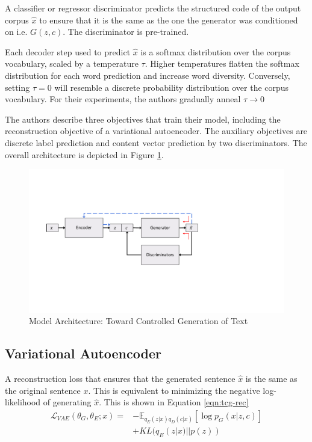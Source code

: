 A classifier or regressor discriminator predicts the structured code of the output corpus $\hat{x}$ to ensure that it is the same as the one the generator was conditioned on i.e. $G(z, c)$. The discriminator is pre-trained.

Each decoder step used to predict $\hat{x}$ is a softmax distribution over the corpus vocabulary, scaled by a temperature $\tau$. Higher temperatures flatten the softmax distribution for each word prediction and increase word diversity. Conversely, setting $\tau = 0$ will resemble a discrete probability distribution over the corpus vocabulary. For their experiments, the authors gradually anneal $\tau \rightarrow 0$

The authors describe three objectives that train their model, including the reconstruction objective of a variational autoencoder. The auxiliary objectives are discrete label prediction and content vector prediction by two discriminators. The overall architecture is depicted in Figure \ref{fig:tcg-architecture}.

\begin{figure}[ht]
	\centering
	\includegraphics[width=\textwidth]{images/tcg-architecture}
	\caption{\label{fig:tcg-architecture} Model Architecture: Toward Controlled Generation of Text}
\end{figure}

\subsection{Variational Autoencoder}

A reconstruction loss that ensures that the generated sentence $\hat{x}$ is the same as the original sentence $x$. This is equivalent to minimizing the negative log-likelihood of generating $\hat{x}$. This is shown in Equation \ref{eqn:tcg-rec}
\begin{align} \label{eqn:tcg-rec}
	\mathcal{L}_{VAE}(\theta_G, \theta_E; x) = &
	- \mathbb{E}_{q_E(z|x)q_D(c|x)}[\log p_G(x|z,c)]  \nonumber \\ &
	+ KL(q_E(z|x)||p(z))
\end{align}


